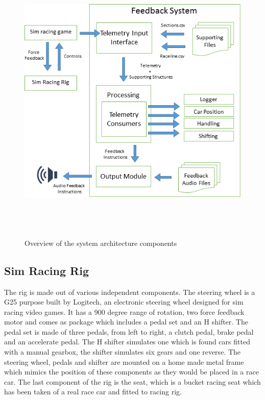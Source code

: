 \begin{figure}[!htb]
	\centering
	\includegraphics[height=14cm]{images/SystemArch}
	\caption{Overview of the system architecture components}
	\label{fig:SystemArch}
\end{figure}

\subsection{Sim Racing Rig}
The rig is made out of various independent components. The steering wheel is a G25 purpose built by Logitech, an electronic steering wheel designed for sim racing video games. It has a 900 degree range of rotation, two force feedback motor and comes as package which includes a pedal set and an H shifter. The pedal set is made of three pedals, from left to right, a clutch pedal, brake pedal and an accelerate pedal. The H shifter simulates one which is found cars fitted with a manual gearbox, the shifter simulates six gears and one reverse. The steering wheel, pedals and shifter are mounted on a home made metal frame which mimics the position of these components as they would be placed in a race car. The last component of the rig is the seat, which is a bucket racing seat which has been taken of a real race car and fitted to racing rig.

